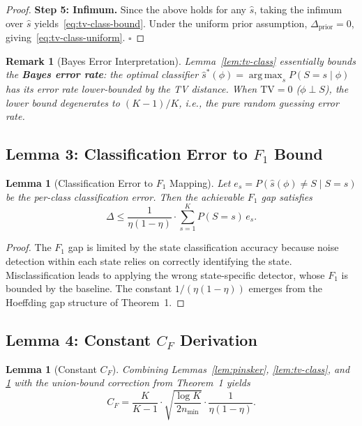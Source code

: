 \documentclass[12pt,a4paper]{article}
\newtheorem{lemma}[theorem]{Lemma}
\newtheorem{remark}[theorem]{Remark}
\newcommand{\argmax}{\operatorname*{arg\,max}}
\newcommand{\TV}{\mathrm{TV}}
\newcommand{\gap}{\Delta}
\begin{document}
\begin{proof}
\textbf{Step 5: Infimum.}
Since the above holds for any $\hat{s}$, taking the infimum over $\hat{s}$ yields~\eqref{eq:tv-class-bound}.
Under the uniform prior assumption, $\Delta_{\mathrm{prior}} = 0$, giving~\eqref{eq:tv-class-uniform}.
\hfill$\square$
\end{proof}

\begin{remark}[Bayes Error Interpretation]
\label{rem:bayes}
Lemma~\ref{lem:tv-class} essentially bounds the \textbf{Bayes error rate}: the optimal classifier
$\hat{s}^*(\phi) = \argmax_s P(S=s \mid \phi)$ has its error rate lower-bounded by the TV distance.
When $\TV = 0$ ($\phi \perp S$), the lower bound degenerates to $(K-1)/K$, i.e., the pure random guessing error rate.
\end{remark}

\subsection{Lemma 3: Classification Error to $F_1$ Bound}

\begin{lemma}[Classification Error to $F_1$ Mapping]
\label{lem:class-f1}
Let $e_s = P(\hat{s}(\phi) \neq S \mid S=s)$ be the per-class classification error.
Then the achievable $F_1$ gap satisfies
\[
\gap \leq \frac{1}{\eta(1-\eta)} \cdot \sum_{s=1}^K P(S=s) \, e_s.
\]
\end{lemma}

\begin{proof}
The $F_1$ gap is limited by the state classification accuracy because noise detection within each state relies on correctly identifying the state. Misclassification leads to applying the wrong state-specific detector, whose $F_1$ is bounded by the baseline. The constant $1/(\eta(1-\eta))$ emerges from the Hoeffding gap structure of Theorem~1.
\end{proof}

\subsection{Lemma 4: Constant $C_F$ Derivation}

\begin{lemma}[Constant $C_F$]
\label{lem:cf}
Combining Lemmas~\ref{lem:pinsker}, \ref{lem:tv-class}, and \ref{lem:class-f1} with the union-bound correction from Theorem~1 yields
\[
C_F = \frac{K}{K-1} \cdot \sqrt{\frac{\log K}{2n_{\min}}} \cdot \frac{1}{\eta(1-\eta)}.
\]
\end{lemma}
\end{document}

